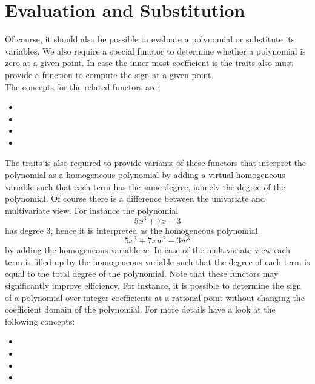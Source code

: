 \section{Evaluation and Substitution}

Of course, it should also be possible to evaluate a polynomial 
or substitute its variables. We also require a special functor to 
determine whether a polynomial is zero at a given point. 
In case the inner most coefficient is  the traits 
also must provide a function to compute the sign at a given point. \\
The concepts for the related functors are:
\begin{itemize}
\item {}\ccGlue
\item {}\ccGlue
\item {}\ccGlue
\item {}
\end{itemize}

The traits is also required to provide variants of these functors that 
interpret the polynomial as a homogeneous polynomial by adding a virtual 
homogeneous variable such that each term has the same degree, namely the degree of the polynomial.
Of course there is a difference between the univariate and multivariate view. 
For instance the polynomial \[5x^3 + 7x - 3\] has degree 3, hence it is interpreted as 
the homogeneous polynomial \[5x^3 + 7xw^2 -3w^3\] by adding the homogeneous variable $w$. 
In case of the multivariate view each term is filled up by the homogeneous variable such 
that the degree of each term is equal to the total degree of the polynomial. 
Note that these functors may significantly improve efficiency. 
For instance, it is possible to determine the sign of a polynomial 
over integer coefficients at a rational point without 
changing the coefficient domain of the polynomial. 
For more details have a look at the following concepts:
\begin{itemize}
\item {} \ccGlue
\item {}\ccGlue
\item {}\ccGlue
\item {}
\end{itemize}

